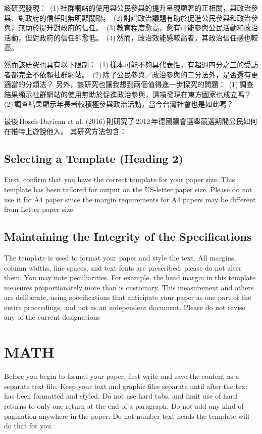\documentclass[letterpaper, 10pt, conference]{ieeeconf}   %
\begin{document}
\begin{CJK*}{UTF8}{bsmi}
該研究發現：
\,(1)\,社群網站的使用與公民參與的提升呈現顯著的正相關，與政治參與、對政府的信任則無明顯關聯。
\,(2)\,討論政治議題有助於促進公民參與和政治參與，無助於提升對政府的信任。
\,(3)\,教育程度愈高，愈有可能參與公民活動和政治活動，但對政府的信任卻愈低。
\,(4)\,然而，政治效能感較高者，其政治信任感也較高。

然而該研究也具有以下限制：
\,(1)\,樣本可能不夠具代表性，有超過四分之三的受訪者都完全不依賴社群網站。
\,(2)\,除了公民參與／政治參與的二分法外，是否還有更適當的分類法？
另外，該研究也讓我想到兩個值得進一步探究的問題：
\,(1)\,調查結果顯示社群網站的使用無助於促進政治參與，這項發現在東方國家也成立嗎？
\,(2)\,調查結果顯示年長者較積極參與政治活動，當今台灣社會也是如此嗎？

最後\,Hosch-Dayican et al. (2016)\,則研究了\,2012\,年德國議會選舉競選期間公民如何在推特上遊說他人。\cite{c3}
其研究方法包含：

\subsection{Selecting a Template (Heading 2)}

First, confirm that you have the correct template for your paper size. This template has been tailored for output on the US-letter paper size. Please do not use it for A4 paper since the margin requirements for A4 papers may be different from Letter paper size.

\subsection{Maintaining the Integrity of the Specifications}

The template is used to format your paper and style the text. All margins, column widths, line spaces, and text fonts are prescribed; please do not alter them. You may note peculiarities. For example, the head margin in this template measures proportionately more than is customary. This measurement and others are deliberate, using specifications that anticipate your paper as one part of the entire proceedings, and not as an independent document. Please do not revise any of the current designations

\section{MATH}

Before you begin to format your paper, first write and save the content as a separate text file. Keep your text and graphic files separate until after the text has been formatted and styled. Do not use hard tabs, and limit use of hard returns to only one return at the end of a paragraph. Do not add any kind of pagination anywhere in the paper. Do not number text heads-the template will do that for you.


\end{CJK*}
\end{document}
